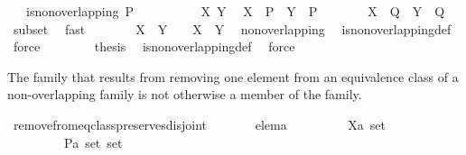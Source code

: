 \begin{isabellebody}
\ \ \ {\isachardoublequoteopen}is{\isacharunderscore}non{\isacharunderscore}overlapping\ P{\isachardoublequoteclose}\isanewline
%
\isadelimproof
\isanewline
%
\endisadelimproof
%
\isatagproof
{}\isamarkupfalse%
\ {\isacharminus}\isanewline
\ \ \isacommand{{\isacharbraceleft}}\isamarkupfalse%
\isanewline
\ \ \ \ \isamarkupfalse%
\ X\ Y\ \isamarkupfalse%
\ {\isachardoublequoteopen}X\ {\isasymin}\ P\ {\isasymand}\ Y\ {\isasymin}\ P{\isachardoublequoteclose}\isanewline
\ \ \ \ \isamarkupfalse%
\ \isamarkupfalse%
\ {\isachardoublequoteopen}X\ {\isasymin}\ Q\ {\isasymand}\ Y\ {\isasymin}\ Q{\isachardoublequoteclose}\ \isamarkupfalse%
\ subset\ \isamarkupfalse%
\ fast\isanewline
\ \ \ \ \isamarkupfalse%
\ \isamarkupfalse%
\ {\isachardoublequoteopen}X\ {\isasyminter}\ Y\ {\isasymnoteq}\ {\isacharbraceleft}{\isacharbraceright}\ {\isasymlongleftrightarrow}\ X\ {\isacharequal}\ Y{\isachardoublequoteclose}\ \isamarkupfalse%
\ non{\isacharunderscore}overlapping\ \isamarkupfalse%
\ is{\isacharunderscore}non{\isacharunderscore}overlapping{\isacharunderscore}def\ \isamarkupfalse%
\ force\isanewline
\ \ \isacommand{{\isacharbraceright}}\isamarkupfalse%
\isanewline
\ \ \isamarkupfalse%
\ \isamarkupfalse%
\ {\isacharquery}thesis\ \isamarkupfalse%
\ is{\isacharunderscore}non{\isacharunderscore}overlapping{\isacharunderscore}def\ \isamarkupfalse%
\ force\isanewline
{}\isamarkupfalse%
%
\endisatagproof
{\isafoldproof}%
%
\isadelimproof
%
\endisadelimproof
%
\begin{isamarkuptext}%
The family that results from removing one element from an equivalence class of a non-overlapping family is not otherwise a member of the family.%
\end{isamarkuptext}%
\isamarkuptrue%
\isamarkupfalse%
\ remove{\isacharunderscore}from{\isacharunderscore}eq{\isacharunderscore}class{\isacharunderscore}preserves{\isacharunderscore}disjoint{\isacharcolon}\isanewline
\ \ \ \ \ \ \ elem{\isacharcolon}{\isacharcolon}{\isacharprime}a\isanewline
\ \ \ \ \ \ \ \ \ X{\isacharcolon}{\isacharcolon}{\isachardoublequoteopen}{\isacharprime}a\ set{\isachardoublequoteclose}\isanewline
\ \ \ \ \ \ \ \ \ P{\isacharcolon}{\isacharcolon}{\isachardoublequoteopen}{\isacharprime}a\ set\ set{\isachardoublequoteclose}\isanewline

\end{isabellebody}
